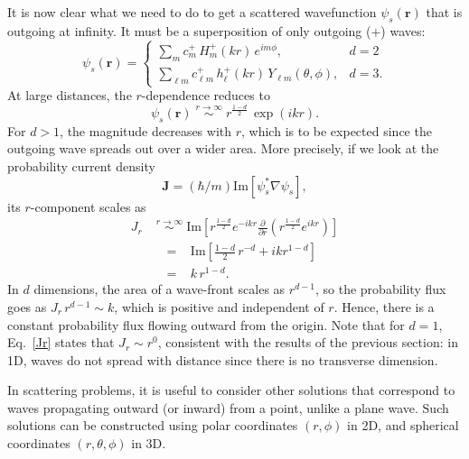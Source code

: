 \documentclass[pra,12pt]{revtex4-2}
\begin{document}
It is now clear what we need to do to get a scattered wavefunction
$\psi_s(\mathbf{r})$ that is outgoing at infinity.  It must be a
superposition of only outgoing ($+$) waves:
\begin{equation}
  \psi_s(\mathbf{r}) = \begin{cases} \displaystyle\sum_{m} c_m^+\,H_m^+(kr)\,e^{im\phi}, &d=2\\ \displaystyle\sum_{\ell m} c_{\ell m}^+\,h_\ell^+(kr)\,Y_{\ell m}(\theta,\phi),&d=3.\end{cases}
\end{equation}
At large distances, the $r$-dependence reduces to
\begin{equation}
  \psi_s(\mathbf{r}) \; \overset{r\rightarrow\infty}{\sim} \; r^{\frac{1-d}{2}} \,\exp\left(ikr\right).
\end{equation}
For $d > 1$, the magnitude decreases with $r$, which is to be expected
since the outgoing wave spreads out over a wider area.  More
precisely, if we look at the probability current density
\begin{equation*}
  \mathbf{J} = (\hbar/m) \mathrm{Im}\left[\psi_s^*\nabla\psi_s\right],  
\end{equation*}
its $r$-component scales as
\begin{equation}
  \begin{aligned}J_r \; &\overset{r\rightarrow\infty}{\sim} \; \mathrm{Im}\left[r^{\frac{1-d}{2}} e^{-ikr} \frac{\partial}{\partial r}\left(r^{\frac{1-d}{2}} e^{ikr}\right)\right] \\ &\;\;=\;\;\;\mathrm{Im}\left[\frac{1-d}{2}\, r^{-d} + ik r^{1-d}\right]\\ &\;\;=\;\;\; k \,r^{1-d}.\end{aligned}
  \label{Jr}
\end{equation}
In $d$ dimensions, the area of a wave-front scales as $r^{d-1}$, so
the probability flux goes as $J_r \,r^{d-1} \sim k$, which is positive
and independent of $r$.  Hence, there is a constant probability flux
flowing outward from the origin.  Note that for $d=1$, Eq.~\eqref{Jr}
states that $J_r \sim r^0$, consistent with the results of the
previous section: in 1D, waves do not spread with distance since there
is no transverse dimension.


In scattering problems, it is useful to consider other solutions that
correspond to waves propagating outward (or inward) from a point,
unlike a plane wave.  Such solutions can be constructed using polar
coordinates $(r, \phi)$ in 2D, and spherical coordinates
$(r,\theta,\phi)$ in 3D.
\end{document}
